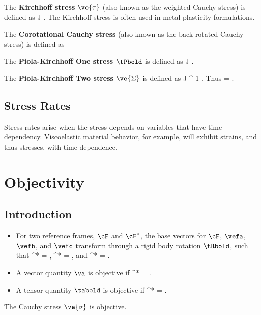 The {\bf Kirchhoff stress} $\ve{\tau}$ (also known as the 
weighted Cauchy stress) is defined as
\be
 \ve{\tau}  J \; \ve{\sigma}. 
\ee
The Kirchhoff stress is often used in metal plasticity formulations.

The {\bf Corotational Cauchy stress} (also known as the back-rotated
Cauchy stress) is defined as
\be
 \hat{\ve{\sigma}}  \tRbold\transpose \ve{\sigma} \tRbold
\ee

The {\bf Piola-Kirchhoff One stress $\tPbold$} is defined as
\be
 \tPbold {} J \; \ve{\sigma} \tFbold \; \minustranspose.
\ee

The {\bf Piola-Kirchhoff Two stress $\ve{\Sigma}$} is defined as
\be
 \ve{\Sigma} 
  J \; \tFbold^{-1} \ve{\sigma} \tFbold \; \minustranspose.
\ee
Thus
\be
 \tPbold = \tFbold \ve{\Sigma}.
\ee


\section{Stress Rates}
Stress rates arise when the stress depends on variables that have
time dependency.  Viscoelastic material behavior, for example, will
exhibit strains, and thus stresses, with time dependence.  

\chapter{Objectivity}
\label{chapter:objectivity}

\section{Introduction}
\begin{itemize}
\item For two reference frames, $\cF$ and $\cF^*$, the base vectors
for $\cF$, $\vefa$, $\vefb$, and $\vefc$ transform through a rigid
body rotation $\tRbold$, such that 
\be
\vefa^* = \tRbold \vefa, \;\;\;
\vefb^* = \tRbold \vefb, \;\;\; \mbox{and} \;\;\;
\vefc^* = \tRbold \vefc.
\ee
%
\item A vector quantity $\va$ is objective if 
\be
 \va^* = \tRbold \va.
\ee
%
\item A tensor quantity $\tabold$ is objective if
\be
 \tabold^* = \tRbold \tabold \tRbold\transpose.
\ee
\end{itemize}

\begin{Hresult}
The Cauchy stress $\ve{\sigma}$ is objective.
\end{Hresult}

